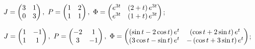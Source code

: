 \begin{enumsolsfull}
		\item \( J = \begin{pmatrix} 3 & 1 \\ 0 & 3 \end{pmatrix}, ~ P = \begin{pmatrix} 1 & 2 \\ 1 & 1 \end{pmatrix}, ~ \Phi = \begin{pmatrix} e^{3t} & \left( 2 + t \right)e^{3t} \\ e^{3t} & \left( 1 + t \right) e^{3t} \end{pmatrix} \); %
		\item \( J = \begin{pmatrix} 1 & -1 \\ 1 & 1 \end{pmatrix}, ~ P = \begin{pmatrix} -2 & 1 \\ 3 & -1 \end{pmatrix}, ~ \Phi = \begin{pmatrix} \left( \sin{t} - 2\cos{t} \right) e^{t} & \left( \cos{t} + 2\sin{t} \right) e^{t} \\ \left( 3\cos{t} - \sin{t} \right) e^{t} & -\left( \cos{t} + 3\sin{t} \right) e^{t} \end{pmatrix} \); %


\end{enumsolsfull}
